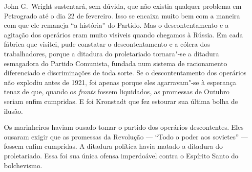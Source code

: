 John G.~Wright sustentará, sem dúvida, que não existia qualquer
problema em Petrogrado até o dia 22 de fevereiro. Isso se encaixa
muito bem com a maneira com que ele remaneja “a história” do Partido.
Mas o descontentamento e a agitação dos operários eram muito visíveis
quando chegamos à Rússia. Em cada fábrica que visitei, pude constatar
o descontentamento e a cólera dos trabalhadores, porque a ditadura do
proletariado tornara"-se a ditadura esmagadora do Partido
Comunista, fundada num sistema de racionamento diferenciado e
discriminações de toda sorte. Se o descontentamento dos operários não
explodiu antes de 1921, foi apenas porque eles agarravam"-se à
esperança tenaz de que, quando os \textit{fronts} fossem liquidados, as
promessas de Outubro seriam enfim cumpridas. E foi Kronstadt que fez
estourar sua última bolha de ilusão.

Os marinheiros haviam ousado tomar o partido dos operários descontentes.
Eles ousaram exigir que as promessas da Revolução --- “Todo o poder aos
sovietes” --- fossem enfim cumpridas. A ditadura política havia matado a
ditadura do proletariado. Essa foi sua única ofensa imperdoável contra o
Espírito Santo do bolchevismo.

